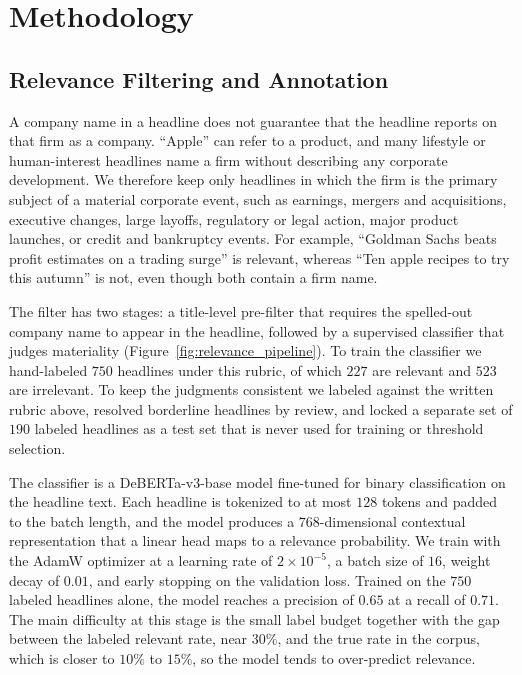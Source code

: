 \documentclass[conference]{IEEEtran}
\begin{document}
\section{Methodology}
\subsection{Relevance Filtering and Annotation}
\label{sec:rel}
A company name in a headline does not guarantee that the headline reports on that
firm as a company. ``Apple'' can refer to a product, and many lifestyle or
human-interest headlines name a firm without describing any corporate
development. We therefore keep only headlines in which the firm is the primary
subject of a material corporate event, such as earnings, mergers and
acquisitions, executive changes, large layoffs, regulatory or legal action, major
product launches, or credit and bankruptcy events. For example, ``Goldman Sachs
beats profit estimates on a trading surge'' is relevant, whereas ``Ten apple
recipes to try this autumn'' is not, even though both contain a firm name.

The filter has two stages: a title-level pre-filter that requires the spelled-out
company name to appear in the headline, followed by a supervised classifier that
judges materiality (Figure~\ref{fig:relevance_pipeline}). To train the classifier
we hand-labeled $750$ headlines under this rubric, of which $227$ are relevant and
$523$ are irrelevant. To keep the judgments consistent we labeled against the
written rubric above, resolved borderline headlines by review, and locked a
separate set of $190$ labeled headlines as a test set that is never used for
training or threshold selection.

The classifier is a DeBERTa-v3-base model fine-tuned for binary classification on
the headline text. Each headline is tokenized to at most $128$ tokens and padded
to the batch length, and the model produces a $768$-dimensional contextual
representation that a linear head maps to a relevance probability. We train with
the AdamW optimizer at a learning rate of $2\times10^{-5}$, a batch size of $16$,
weight decay of $0.01$, and early stopping on the validation loss. Trained on the
$750$ labeled headlines alone, the model reaches a precision of $0.65$ at a recall
of $0.71$. The main difficulty at this stage is the small label budget together
with the gap between the labeled relevant rate, near $30\%$, and the true rate in
the corpus, which is closer to $10\%$ to $15\%$, so the model tends to
over-predict relevance.
\end{document}
